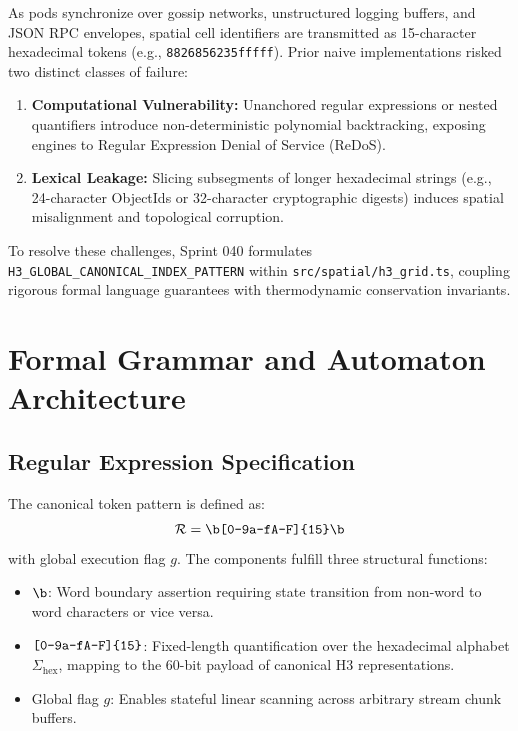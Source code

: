 \documentclass[10pt,journal,compsoc]{IEEEtran}
\begin{document}
As pods synchronize over gossip networks, unstructured logging buffers, and JSON RPC envelopes, spatial cell identifiers are transmitted as 15-character hexadecimal tokens (e.g., \texttt{8826856235fffff}). Prior naive implementations risked two distinct classes of failure:
\begin{enumerate}
    \item \textbf{Computational Vulnerability:} Unanchored regular expressions or nested quantifiers introduce non-deterministic polynomial backtracking, exposing engines to Regular Expression Denial of Service (ReDoS).
    \item \textbf{Lexical Leakage:} Slicing subsegments of longer hexadecimal strings (e.g., 24-character ObjectIds or 32-character cryptographic digests) induces spatial misalignment and topological corruption.
\end{enumerate}

To resolve these challenges, Sprint 040 formulates \texttt{H3\_GLOBAL\_CANONICAL\_INDEX\_PATTERN} within \texttt{src/spatial/h3\_grid.ts}, coupling rigorous formal language guarantees with thermodynamic conservation invariants.

\section{Formal Grammar and Automaton Architecture}

\subsection{Regular Expression Specification}
The canonical token pattern is defined as:
\begin{equation}
\mathcal{R} = \verb|\b[0-9a-fA-F]{15}\b|
\end{equation}
with global execution flag $g$. The components fulfill three structural functions:
\begin{itemize}
    \item $\verb|\b|$: Word boundary assertion requiring state transition from non-word to word characters or vice versa.
    \item $\verb|[0-9a-fA-F]{15}|$: Fixed-length quantification over the hexadecimal alphabet $\Sigma_{\text{hex}}$, mapping to the 60-bit payload of canonical H3 representations.
    \item Global flag $g$: Enables stateful linear scanning across arbitrary stream chunk buffers.
\end{itemize}
\end{document}
